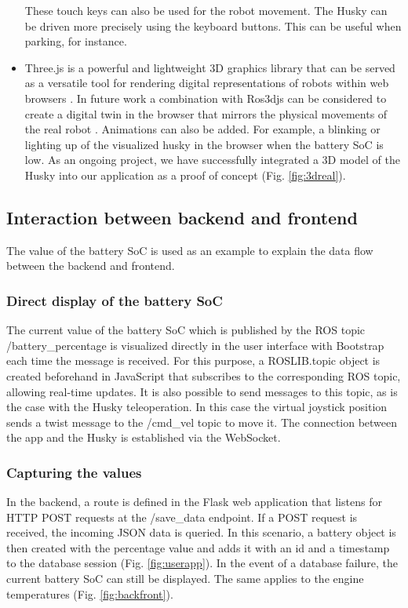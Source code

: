 \documentclass[conference]{IEEEtran}
\begin{document}
\begin{itemize}
These touch keys can also be used for the robot movement. The Husky can be driven more precisely using the keyboard buttons. This can be useful when parking, for instance.
\item Three.js is a powerful and lightweight 3D graphics library that can be served as a versatile tool for rendering digital representations of robots within web browsers \cite{threejs}. In future work a combination with Ros3djs can be considered to create a digital twin in the browser that mirrors the physical movements of the real robot \cite{ros3djs}. Animations can also be added. For example, a blinking or lighting up of the visualized husky in the browser when the battery SoC is low. 
As an ongoing project, we have successfully integrated a 3D model of the Husky into our application as a proof of concept (Fig. \ref{fig:3dreal}).
\end{itemize}

\subsection{Interaction between backend and frontend}
The value of the battery SoC is used as an example to explain the data flow between the backend and frontend. 
\subsubsection{Direct display of the battery SoC}
The current value of the battery SoC which is published by the ROS topic /battery\_percentage is visualized directly in the user interface with Bootstrap each time the message is received. For this purpose, a ROSLIB.topic object is created beforehand in JavaScript that subscribes to the corresponding ROS topic, allowing real-time updates. It is also possible to send messages to this topic, as is the case with the Husky teleoperation. 
In this case the virtual joystick position sends a twist message to the /cmd\_vel topic to move it. 
The connection between the app and the Husky is established via the WebSocket. 
\subsubsection{Capturing the values}
In the backend, a route is defined in the Flask web application that listens for HTTP POST requests at the /save\_data endpoint. If a POST request is received, the incoming JSON data is queried. In this scenario, a battery object is then created with the percentage value and adds it with an id and a timestamp to the database session (Fig. \ref{fig:userapp}). In the event of a database failure, the current battery SoC can still be displayed. The same applies to the engine temperatures (Fig. \ref{fig:backfront}).
\end{document}
